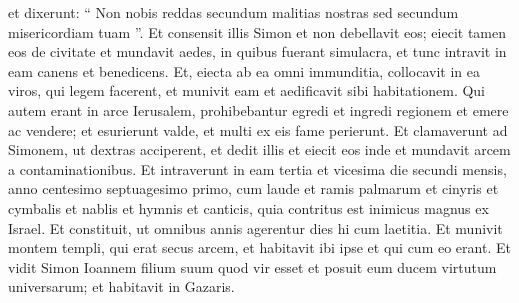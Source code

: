 \begin{biblechapter}
\begin{biblechapter}
\begin{biblechapter}
\begin{biblechapter}
\begin{biblechapter}
\begin{biblechapter}
\begin{biblechapter}
\begin{biblechapter}
\begin{biblechapter}
\begin{biblechapter}
\begin{biblechapter}
\begin{biblechapter}
\begin{biblechapter}
\verse et dixerunt: “ Non nobis reddas secundum malitias nostras sed secundum misericordiam tuam ”. 
\verse Et consensit illis Simon et non debellavit eos; eiecit tamen eos de civitate et mundavit aedes, in quibus fuerant simulacra, et tunc intravit in eam canens et benedicens. 
\verse Et, eiecta ab ea omni immunditia, collocavit in ea viros, qui legem facerent, et munivit eam et aedificavit sibi habitationem.
 \verse Qui autem erant in arce Ierusalem, prohibebantur egredi et ingredi regionem et emere ac vendere; et esurierunt valde, et multi ex eis fame perierunt. 
\verse Et clamaverunt ad Simonem, ut dextras acciperent, et dedit illis et eiecit eos inde et mundavit arcem a contaminationibus. 
\verse Et intraverunt in eam tertia et vicesima die secundi mensis, anno centesimo septuagesimo primo, cum laude et ramis palmarum et cinyris et cymbalis et nablis et hymnis et canticis, quia contritus est inimicus magnus ex Israel. 
\verse Et constituit, ut omnibus annis agerentur dies hi cum laetitia. 
\verse Et munivit montem templi, qui erat secus arcem, et habitavit ibi ipse et qui cum eo erant. 
\verse Et vidit Simon Ioannem filium suum quod vir esset et posuit eum ducem virtutum universarum; et habitavit in Gazaris.
 

\end{biblechapter}
\end{biblechapter}
\end{biblechapter}
\end{biblechapter}
\end{biblechapter}
\end{biblechapter}
\end{biblechapter}
\end{biblechapter}
\end{biblechapter}
\end{biblechapter}
\end{biblechapter}
\end{biblechapter}
\end{biblechapter}

